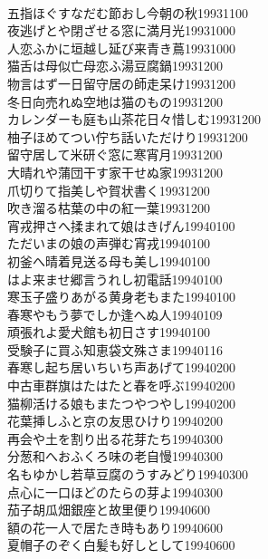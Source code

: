 \begin{multicols}{2}
\\五指ほぐすなだむ節おし今朝の秋\hfill{19931100}
\\夜逃げとや閉ざせる窓に満月光\hfill{19931000}
\\人恋ふかに垣越し延び来青き蔦\hfill{19931000}
\\猫舌は母似亡母恋ふ湯豆腐鍋\hfill{19931200}
\\物言はず一日留守居の師走呆け\hfill{19931200}
\\冬日向売れぬ空地は猫のもの\hfill{19931200}
\\カレンダーも庭も山茶花日々惜しむ\hfill{19931200}
\\柚子ほめてつい佇ち話いただけり\hfill{19931200}
\\留守居して米研ぐ窓に寒宵月\hfill{19931200}
\\大晴れや蒲団干す家干せぬ家\hfill{19931200}
\\爪切りて指美しや賀状書く\hfill{19931200}
\\吹き溜る枯葉の中の紅一葉\hfill{19931200}
\\宵戎押さへ揉まれて娘はきげん\hfill{19940100}
\\ただいまの娘の声弾む宵戎\hfill{19940100}
\\初釜へ晴着見送る母も美し\hfill{19940100}
\\はよ来ませ郷言うれし初電話\hfill{19940100}
\\寒玉子盛りあがる黄身老もまた\hfill{19940100}
\\春寒やもう夢でしか逢へぬ人\hfill{19940109}
\\頑張れよ愛犬館も初日さす\hfill{19940100}
\\受験子に買ふ知恵袋文殊さま\hfill{19940116}
\\春寒し起ち居いちいち声あげて\hfill{19940200}
\\中古車群旗はたはたと春を呼ぶ\hfill{19940200}
\\猫柳活ける娘もまたつやつやし\hfill{19940200}
\\花葉挿しふと京の友思ひけり\hfill{19940200}
\\再会や土を割り出る花芽たち\hfill{19940300}
\\分葱和へおふくろ味の老自慢\hfill{19940300}
\\名もゆかし若草豆腐のうすみどり\hfill{19940300}
\\点心に一口ほどのたらの芽よ\hfill{19940300}
\\茄子胡瓜畑銀座と故里便り\hfill{19940600}
\\額の花一人で居たき時もあり\hfill{19940600}
\\夏帽子のぞく白髪も好しとして\hfill{19940600}

\end{multicols}

